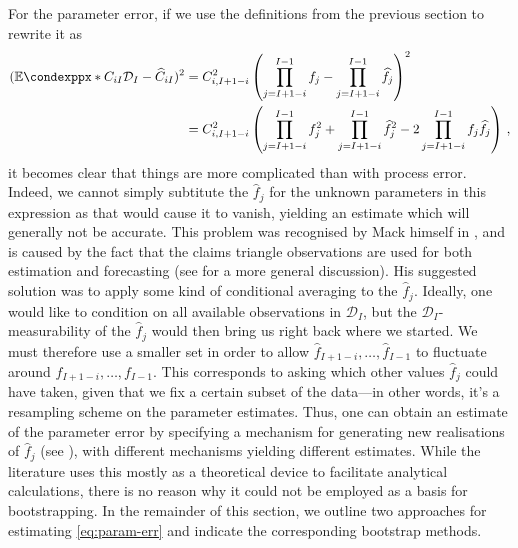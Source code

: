 \documentclass[a4paper]{book}
\begin{document}
For the parameter error, if we use the definitions from the previous section to rewrite it as
\begin{align} \label{eq:param-err}
  (\condexpp*{C_{iI}}{\mathcal{D}_I} - \widehat{C}_{iI})^2 &= C^2_{i, I+1-i} \left( \prod_{j=I+1-i}^{I-1}f_j - \prod_{j=I+1-i}^{I-1}\widehat{f}_j \right)^2 \\
  &= C^2_{i, I+1-i} \left( \prod_{j=I+1-i}^{I-1}f^2_j + \prod_{j=I+1-i}^{I-1}\widehat{f}^2_j - 2 \prod_{j=I+1-i}^{I-1}f_j \widehat{f}_j \right) \,,
\end{align}
it becomes clear that things are more complicated than with process error. Indeed, we cannot simply subtitute the $\widehat{f}_j$ for the unknown parameters in this expression as that would cause it to vanish, yielding an estimate which will generally not be accurate. This problem was recognised by Mack himself in \cite{mack:chain-ladder-variability}, and is caused by the fact that the claims triangle observations are used for both estimation and forecasting (see \cite[Section 2]{lindholm:msep} for a more general discussion). His suggested solution was to apply some kind of conditional averaging to the $\widehat{f}_j$. Ideally, one would like to condition on all available observations in $\mathcal{D}_I$, but the $\mathcal{D}_I$-measurability of the $\widehat{f}_j$ would then bring us right back where we started. We must therefore use a smaller set in order to allow $\widehat{f}_{I + 1 - i}, \dots, \widehat{f}_{I - 1}$ to fluctuate around $f_{I + 1 - i}, \dots, f_{I - 1}$. This corresponds to asking which other values $\widehat{f}_j$ could have taken, given that we fix a certain subset of the data---in other words, it's a resampling scheme on the parameter estimates. Thus, one can obtain an estimate of the parameter error by specifying a mechanism for generating new realisations of $\widehat{f}_j$ (see \cites{wuthrich:chain-ladder-msep}[44 \psqq]{wuthrich:stochastic-reserving}), with different mechanisms yielding different estimates. While the literature uses this mostly as a theoretical device to facilitate analytical calculations, there is no reason why it could not be employed as a basis for bootstrapping. In the remainder of this section, we outline two approaches for estimating \cref{eq:param-err} and indicate the corresponding bootstrap methods.
\end{document}
